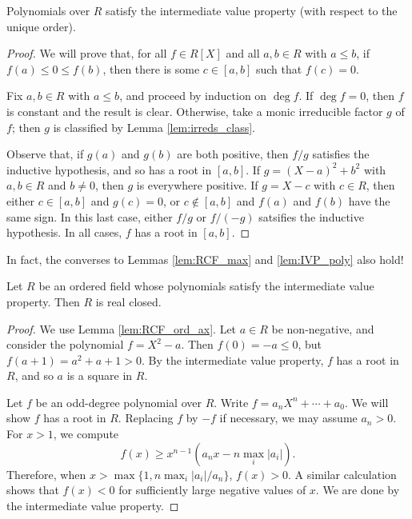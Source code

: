 \begin{lemma}
  \label{lem:IVP_poly}
  \leanok
  Polynomials over $R$ satisfy the intermediate value property (with respect to the unique order).
\end{lemma}
\begin{proof}
  \leanok
  We will prove that, for all $f\in R[X]$ and all $a,b\in R$ with $a\leq b$, if $f(a)\leq 0\leq f(b)$, then there is some $c\in[a,b]$ such that $f(c)=0$.

  Fix $a,b\in R$ with $a\leq b$, and proceed by induction on $\deg f$. If $\deg f=0$, then $f$ is constant and the result is clear. Otherwise, take a monic irreducible factor $g$ of $f$; then $g$ is classified by Lemma \ref{lem:irreds_class}.

  Observe that, if $g(a)$ and $g(b)$ are both positive, then $f/g$ satisfies the inductive hypothesis, and so has a root in $[a,b]$. If $g=(X-a)^2+b^2$ with $a,b\in R$ and $b\neq0$, then $g$ is everywhere positive. If $g=X-c$ with $c\in R$, then either $c\in[a,b]$ and $g(c)=0$, or $c\notin[a,b]$ and $f(a)$ and $f(b)$ have the same sign. In this last case, either $f/g$ or $f/(-g)$ satsifies the inductive hypothesis. In all cases, $f$ has a root in $[a,b]$.
\end{proof}

In fact, the converses to Lemmas \ref{lem:RCF_max} and \ref{lem:IVP_poly} also hold!

\begin{theorem}
  \label{thm:IVP_poly_imp_RCF}
  \leanok
  Let $R$ be an ordered field whose polynomials satisfy the intermediate value property. Then $R$ is real closed.
\end{theorem}
\begin{proof}
  \leanok
  We use Lemma \ref{lem:RCF_ord_ax}. Let $a\in R$ be non-negative, and consider the polynomial $f=X^2-a$. Then $f(0)=-a\leq0$, but $f(a+1)=a^2+a+1>0$. By the intermediate value property, $f$ has a root in $R$, and so $a$ is a square in $R$.

  Let $f$ be an odd-degree polynomial over $R$. Write $f=a_nX^n+\cdots+a_0$. We will show $f$ has a root in $R$. Replacing $f$ by $-f$ if necessary, we may assume $a_n>0$. For $x>1$, we compute
  \[f(x)\geq x^{n-1}(a_nx-n\max_i|a_i|).\]
  Therefore, when $x>\max\{1,n\max_i|a_i|/a_n\}$, $f(x)>0$. A similar calculation shows that $f(x)<0$ for sufficiently large negative values of $x$. We are done by the intermediate value property.
\end{proof}

